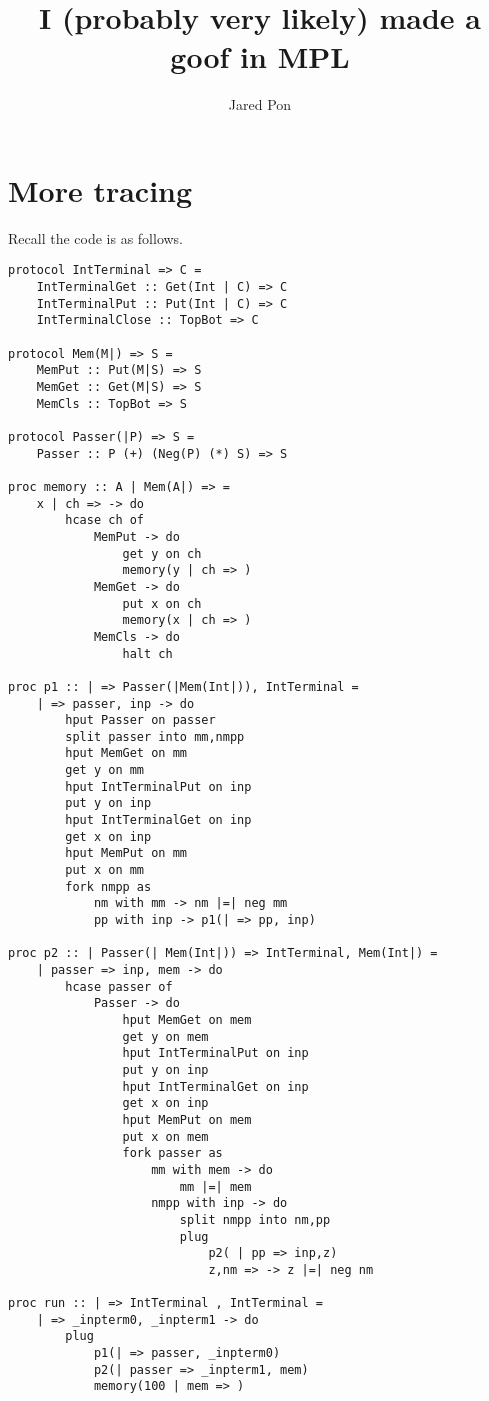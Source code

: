\documentclass{article}
\title{I (probably very likely) made a goof in MPL}
\author{Jared Pon}
\theoremstyle{plain}%
\theoremstyle{definition}
\theoremstyle{remark}
\begin{document}
\maketitle 
\section{More tracing}
Recall the code is as follows.
\begin{verbatim}
protocol IntTerminal => C =
    IntTerminalGet :: Get(Int | C) => C
    IntTerminalPut :: Put(Int | C) => C
    IntTerminalClose :: TopBot => C

protocol Mem(M|) => S =
    MemPut :: Put(M|S) => S
    MemGet :: Get(M|S) => S
    MemCls :: TopBot => S

protocol Passer(|P) => S =
    Passer :: P (+) (Neg(P) (*) S) => S

proc memory :: A | Mem(A|) => =
    x | ch => -> do
        hcase ch of
            MemPut -> do
                get y on ch
                memory(y | ch => )
            MemGet -> do
                put x on ch
                memory(x | ch => )
            MemCls -> do
                halt ch

proc p1 :: | => Passer(|Mem(Int|)), IntTerminal = 
    | => passer, inp -> do
        hput Passer on passer
        split passer into mm,nmpp
        hput MemGet on mm 
        get y on mm
        hput IntTerminalPut on inp
        put y on inp
        hput IntTerminalGet on inp
        get x on inp
        hput MemPut on mm
        put x on mm
        fork nmpp as
            nm with mm -> nm |=| neg mm
            pp with inp -> p1(| => pp, inp)

proc p2 :: | Passer(| Mem(Int|)) => IntTerminal, Mem(Int|) =
    | passer => inp, mem -> do
        hcase passer of
            Passer -> do
                hput MemGet on mem
                get y on mem
                hput IntTerminalPut on inp
                put y on inp
                hput IntTerminalGet on inp
                get x on inp
                hput MemPut on mem
                put x on mem
                fork passer as
                    mm with mem -> do
                        mm |=| mem
                    nmpp with inp -> do
                        split nmpp into nm,pp
                        plug
                            p2( | pp => inp,z)
                            z,nm => -> z |=| neg nm

proc run :: | => IntTerminal , IntTerminal =
    | => _inpterm0, _inpterm1 -> do
        plug 
            p1(| => passer, _inpterm0)
            p2(| passer => _inpterm1, mem)
            memory(100 | mem => )
\end{verbatim}
\end{document}
